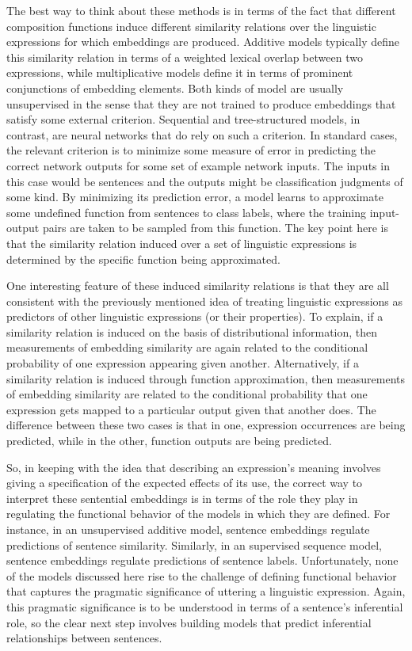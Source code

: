The best way to think about these methods is in terms of the fact that different composition functions induce different similarity relations over the linguistic expressions for which embeddings are produced. Additive models typically define this similarity relation in terms of a weighted lexical overlap between two expressions, while multiplicative models define it in terms of prominent conjunctions of embedding elements. Both kinds of model are usually unsupervised in the sense that they are not trained to produce embeddings that satisfy some external criterion. Sequential and tree-structured models, in contrast, are neural networks that do rely on such a criterion. In standard cases, the relevant criterion is to minimize some measure of error in predicting the correct network outputs for some set of example network inputs. The inputs in this case would be sentences and the outputs might be classification judgments of some kind. By minimizing its prediction error, a model learns to approximate some undefined function from sentences to class labels, where the training input-output pairs are taken to be sampled from this function. The key point here is that the similarity relation induced over a set of linguistic expressions is determined by the specific function being approximated.

One interesting feature of these induced similarity relations is that they are all consistent with the previously mentioned idea of treating linguistic expressions as predictors of other linguistic expressions (or their properties). To explain, if a similarity relation is induced on the basis of distributional information, then measurements of embedding similarity are again related to the conditional probability of one expression appearing given another. Alternatively, if a similarity relation is induced through function approximation, then measurements of embedding similarity are related to the conditional probability that one expression gets mapped to a particular output given that another does. The difference between these two cases is that in one, expression occurrences are being predicted, while in the other, function outputs are being predicted. 

So, in keeping with the idea that describing an expression's meaning involves giving a specification of the expected effects of its use, the correct way to interpret these sentential embeddings is in terms of the role they play in regulating the functional behavior of the models in which they are defined. For instance, in an unsupervised additive model, sentence embeddings regulate predictions of sentence similarity. Similarly, in an supervised sequence model, sentence embeddings regulate predictions of sentence labels. Unfortunately, none of the models discussed here rise to the challenge of defining functional behavior that captures the pragmatic significance of uttering a linguistic expression. Again, this pragmatic significance is to be understood in terms of a sentence's inferential role, so the clear next step involves building models that predict inferential relationships between sentences.  


